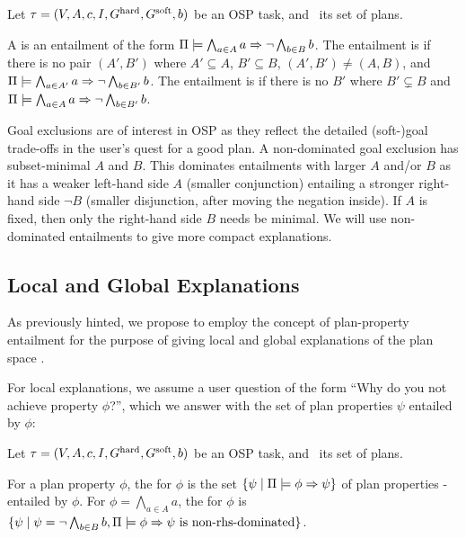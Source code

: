 \begin{definition}
Let $\tau =
(V,\allowbreak A,\allowbreak{\ensuremath{c}},\allowbreak I,\allowbreak G^{\text{\textup{hard}}},\allowbreak G^{\text{\textup{soft}}},\allowbreak{\ensuremath{b}})$
be an OSP task, and \plans\ its set of plans.

A  is an entailment of the form
$\Pi \models \bigwedge_{a \in A} a \Rightarrow \neg \bigwedge_{b \in B}
  b$. 
%
The entailment is  if there is no pair
$(A',B')$ where $A' \subseteq A$, $B' \subseteq B$, $(A',B') \neq
(A,B)$, and $\Pi \models \bigwedge_{a \in A'} a \Rightarrow \neg
  \bigwedge_{b \in B'} b$.
%
The entailment is  if there is no $B'$
where $B' \subsetneq B$ and $\Pi \models \bigwedge_{a \in A}
  a \Rightarrow \neg \bigwedge_{b \in B'} b$.
\end{definition}

Goal exclusions are of interest in OSP as they reflect the detailed
(soft-)goal trade-offs in the user's quest for a good plan. A
non-dominated goal exclusion has subset-minimal $A$ and $B$. This
dominates entailments with larger $A$ and/or $B$ as it has a weaker
left-hand side $A$ (smaller conjunction) entailing a stronger
right-hand side $\neg B$ (smaller disjunction, after moving the
negation inside). If $A$ is fixed, then only the right-hand side $B$
needs be minimal. We will use non-dominated entailments to give more
compact explanations.



\subsection{Local and Global Explanations}

As previously hinted, we propose to employ the concept of
plan-property entailment for the purpose of giving local and global
explanations of the plan space \plans. 

For local explanations, we assume a user question of the form ``Why do
you not achieve property $\phi$?'', which we answer with the set of
plan properties $\psi$ entailed by $\phi$:

\begin{definition}
\label{def:local-explanation}
Let $\tau =
(V,\allowbreak A,\allowbreak{\ensuremath{c}},\allowbreak I,\allowbreak G^{\text{\textup{hard}}},\allowbreak G^{\text{\textup{soft}}},\allowbreak{\ensuremath{b}})$
be an OSP task, and \plans\ its set of plans.

For a plan property $\phi$, the  for
$\phi$ is the set $\{\psi \mid \Pi \models \phi \Rightarrow \psi\}$ of plan
properties \plans-entailed by $\phi$.
%
For $\phi = \bigwedge_{a \in A} a$, the 
for $\phi$ is $\{\psi \mid \psi = \neg \bigwedge_{b \in B} b,
\Pi \models \phi \Rightarrow \psi \text{ is non-rhs-dominated}\}$.
\end{definition}

